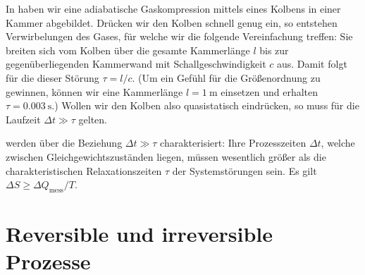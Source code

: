 In  haben wir eine adiabatische Gaskompression mittels eines Kolbens in einer Kammer abgebildet. Drücken wir den Kolben schnell genug ein, so entstehen Verwirbelungen des Gases, für welche wir die folgende Vereinfachung treffen: Sie breiten sich vom Kolben über die gesamte Kammerlänge $l$ bis zur gegenüberliegenden Kammerwand mit Schallgeschwindigkeit $c$ aus. Damit folgt für die  dieser Störung $\tau =l/c$. (Um ein Gefühl für die Größenordnung zu gewinnen, können wir eine Kammerlänge $l=\SI{1}{\m}$ einsetzen und erhalten $\tau=\SI{0.003}{\s}$.) Wollen wir den Kolben also quasistatisch eindrücken, so muss für die Laufzeit $\Delta t \gg\tau$ gelten.
\begin{formal}
     werden über die Beziehung $\Delta t \gg\tau$ charakterisiert: Ihre Prozesszeiten $\Delta t$, welche zwischen Gleichgewichtszuständen liegen, müssen wesentlich größer als die charakteristischen Relaxationszeiten $\tau$ der Systemstörungen sein.
    Es gilt $\Delta S\geq\Delta Q_{\mathrm{mess}}/T$.
\end{formal}  

\section{Reversible und irreversible Prozesse}

